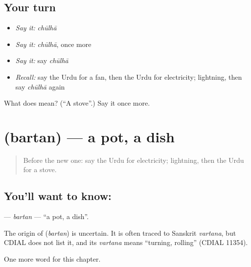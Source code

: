 \subsection*{Your turn}
\begin{itemize}
\raggedright
  \item \emph{Say it:} \emph{chūlhā}
  \item \emph{Say it:} \emph{chūlhā}, once more
  \item \emph{Say it:} say \emph{chūlhā}
  \item \emph{Recall:} say the Urdu for a fan, then the Urdu for electricity; lightning, then say \emph{chūlhā} again
\end{itemize}

\begin{tcolorbox}[breakable,colback=teal!4,colframe=teal!35!black,title={Before you move on}]
What does  mean? (\textquotedblleft{}A stove\textquotedblright{}.) Say it once more.
\end{tcolorbox}
\section[\texorpdfstring{\ur{برتن} (bartan)}{برتن (bartan)}]{ (bartan) — a pot, a dish}

\label{lesson:UR-C109-bartan}



\begin{quote}
Before the new one: say the Urdu for electricity; lightning, then the Urdu for a stove.
\end{quote}

\subsection*{You'll want to know: }
\textbf{} — \emph{bartan} — \textquotedblleft{}a pot, a dish\textquotedblright{}.

\begin{cousinweb}
The origin of \textbf{} (\emph{bartan}) is uncertain. It is often traced to Sanskrit \emph{vartana}, but CDIAL does not list it, and its \emph{vartana} means \textquotedblleft{}turning, rolling\textquotedblright{} (CDIAL 11354).
\end{cousinweb}

\begin{grammarlens}[title={What you've built}]
One more word for this chapter.
\end{grammarlens}

